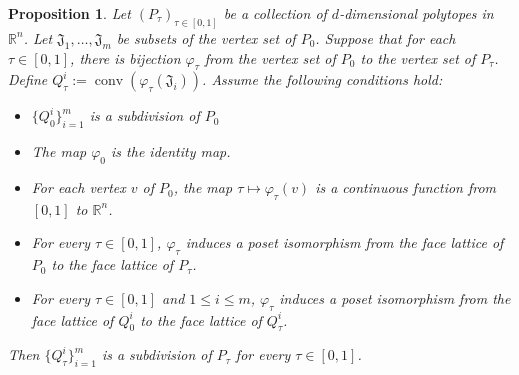 \documentclass{amsart}
\newtheorem{proposition}[thm]{Proposition}
\theoremstyle{definition}
\newcommand{\bR}{\mathbb{R}}
\newcommand{\fJ}{\mathfrak{J}}
\DeclareMathOperator{\conv}{conv}
\begin{document}
\begin{proposition}{\cite[Proposition A.1]{DSBW25}}\label{prop:path-subdivision}
    Let $(P_\tau)_{\tau\in[0,1]}$ be a collection of $d$-dimensional polytopes in $\bR^n$. Let $\fJ_1,\dots,\fJ_m$ be subsets of the vertex set of $P_0$. Suppose that for each $\tau\in[0,1]$, there is bijection $\varphi_\tau$ from the vertex set of $P_0$ to the vertex set of $P_\tau$. Define $Q_\tau^i:=\conv(\varphi_\tau(\fJ_i))$. Assume the following conditions hold:
    \begin{itemize}
        \item $\{Q_0^i\}_{i=1}^m$ is a subdivision of $P_0$
        \item The map $\varphi_0$ is the identity map.
        \item For each vertex $v$ of $P_0$, the map $\tau\mapsto \varphi_\tau(v)$ is a continuous function from $[0,1]$ to $\bR^n$.
        \item For every $\tau\in [0,1]$, $\varphi_\tau$ induces a poset isomorphism from the face lattice of $P_0$ to the face lattice of $P_\tau$.
        \item For every $\tau\in[0,1]$ and $1 \le i \leq m$, $\varphi_\tau$ induces a poset isomorphism from the face lattice of $Q_0^i$ to the face lattice of $Q_\tau^i$.
    \end{itemize}
    Then $\{Q_\tau^i\}_{i=1}^m$ is a subdivision of $P_\tau$ for every $\tau\in[0,1]$.
\end{proposition}
\end{document}
